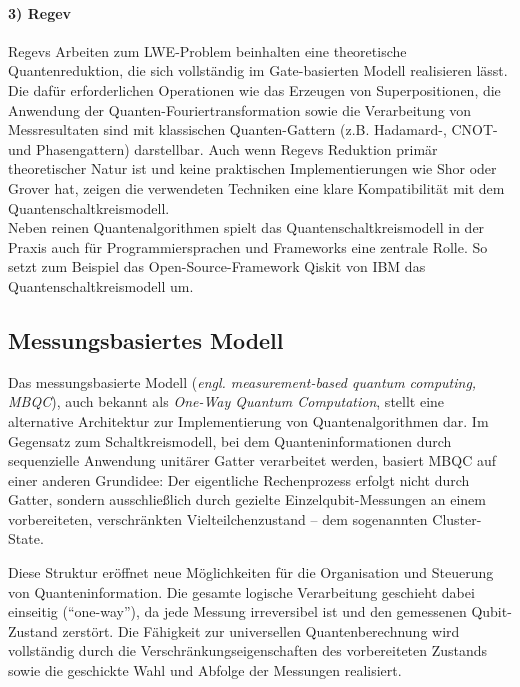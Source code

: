 \paragraph*{3) Regev}
Regevs Arbeiten zum LWE-Problem beinhalten eine theoretische Quantenreduktion, die sich vollständig im Gate-basierten Modell realisieren lässt. Die dafür erforderlichen Operationen wie das Erzeugen von Superpositionen, die Anwendung der Quanten-Fouriertransformation sowie die Verarbeitung von Messresultaten sind mit klassischen Quanten-Gattern (z.B. Hadamard-, CNOT- und Phasengattern) darstellbar. Auch wenn Regevs Reduktion primär theoretischer Natur ist und keine praktischen Implementierungen wie Shor oder Grover hat, zeigen die verwendeten Techniken eine klare Kompatibilität mit dem Quantenschaltkreismodell. \autocite{regev_lattices_2024}
\\

Neben reinen Quantenalgorithmen spielt das Quantenschaltkreismodell in der Praxis auch für Programmiersprachen und Frameworks eine zentrale Rolle. So setzt zum Beispiel das Open-Source-Framework Qiskit von IBM das Quantenschaltkreismodell um.

\subsection{Messungsbasiertes Modell}
Das messungsbasierte Modell (\textit{engl. measurement-based quantum computing, MBQC}), auch bekannt als \textit{One-Way Quantum Computation}, stellt eine alternative Architektur zur Implementierung von Quantenalgorithmen dar. Im Gegensatz zum Schaltkreismodell, bei dem Quanteninformationen durch sequenzielle Anwendung unitärer Gatter verarbeitet werden, basiert MBQC auf einer anderen Grundidee: Der eigentliche Rechenprozess erfolgt nicht durch Gatter, sondern ausschließlich durch gezielte Einzelqubit-Messungen an einem vorbereiteten, verschränkten Vielteilchenzustand – dem sogenannten Cluster-State.

Diese Struktur eröffnet neue Möglichkeiten für die Organisation und Steuerung von Quanteninformation. Die gesamte logische Verarbeitung geschieht dabei einseitig (\enquote{one-way}), da jede Messung irreversibel ist und den gemessenen Qubit-Zustand zerstört. Die Fähigkeit zur universellen Quantenberechnung wird vollständig durch die Verschränkungseigenschaften des vorbereiteten Zustands sowie die geschickte Wahl und Abfolge der Messungen realisiert. \autocite[2-4]{briegelMeasurementbasedQuantumComputation2009}

